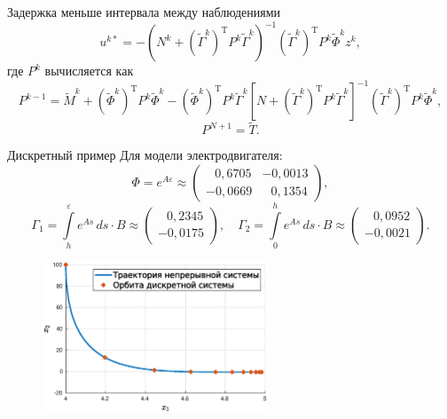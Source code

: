         \begin{frame}{Задержка меньше интервала между наблюдениями}
$$
        u^{k*} = -(N^k + (\tilde\Gamma^k)^{\mathrm{T}} P^{k}\tilde\Gamma^k)^{-1}(\tilde\Gamma^k)^{\mathrm{T}} P^{k} \tilde\Phi^k z^k,
$$
        где $P^k$ вычисляется как
$$
        P^{k-1} = \tilde M^k + (\tilde\Phi^k)^{\mathrm{T}}P^k\tilde\Phi^k - (\tilde\Phi^k)^{\mathrm{T}}P^k\tilde\Gamma^k[N + (\tilde\Gamma^k)^{\mathrm{T}}P^k\tilde\Gamma^k]^{-1}(\tilde\Gamma^k)^{\mathrm{T}}P^k\tilde\Phi^k,
$$
$$
        P^{N+1} = \tilde T.
$$
        \end{frame}
        \begin{frame}{Дискретный пример}
Для модели электродвигателя:
$$
        \Phi = e^{A\varepsilon} \approx \begin{pmatrix}
\;\;\,0,\!6705 & -0,\!0013 \\
-0,\!0669 & \;\;\,0,\!1354
        \end{pmatrix},
$$
$$
        \Gamma_1 = \int\limits_{h}^{\varepsilon}
        e^{As}\,ds \cdot B \approx
\begin{pmatrix}
\;\;\,0,\!2345 \\
-0,\!0175
\end{pmatrix}, \quad
        \Gamma_2 = \int\limits_{0}^{h}
        e^{As}\,ds \cdot B \approx
        \begin{pmatrix}
\;\;\,0,\!0952 \\
-0,\!0021
        \end{pmatrix}.
$$
\begin{figure}
        \includegraphics[width=0.6\textwidth]{content/discrete-example/cont-and-disc.eps}
\end{figure}
        \end{frame}
